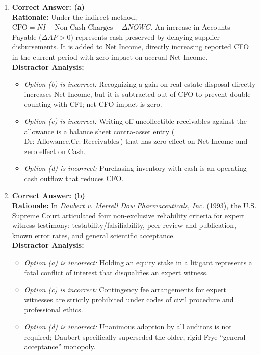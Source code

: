\begin{enumerate}[label=\textbf{MCQ 3.\arabic*}]
    \item \textbf{Correct Answer: (a)}\\
    \textbf{Rationale:} Under the indirect method, $\text{CFO} = NI + \text{Non-Cash Charges} - \Delta NOWC$. An increase in Accounts Payable ($\Delta AP > 0$) represents cash preserved by delaying supplier disbursements. It is added to Net Income, directly increasing reported CFO in the current period with zero impact on accrual Net Income.\\
    \textbf{Distractor Analysis:}
    \begin{itemize}
        \item \textit{Option (b) is incorrect:} Recognizing a gain on real estate disposal directly increases Net Income, but it is subtracted out of CFO to prevent double-counting with CFI; net CFO impact is zero.
        \item \textit{Option (c) is incorrect:} Writing off uncollectible receivables against the allowance is a balance sheet contra-asset entry ($\text{Dr: Allowance}, \text{Cr: Receivables}$) that has zero effect on Net Income and zero effect on Cash.
        \item \textit{Option (d) is incorrect:} Purchasing inventory with cash is an operating cash outflow that reduces CFO.
    \end{itemize}

    \item \textbf{Correct Answer: (b)}\\
    \textbf{Rationale:} In \textit{Daubert v. Merrell Dow Pharmaceuticals, Inc.} (1993), the U.S. Supreme Court articulated four non-exclusive reliability criteria for expert witness testimony: testability/falsifiability, peer review and publication, known error rates, and general scientific acceptance.\\
    \textbf{Distractor Analysis:}
    \begin{itemize}
        \item \textit{Option (a) is incorrect:} Holding an equity stake in a litigant represents a fatal conflict of interest that disqualifies an expert witness.
        \item \textit{Option (c) is incorrect:} Contingency fee arrangements for expert witnesses are strictly prohibited under codes of civil procedure and professional ethics.
        \item \textit{Option (d) is incorrect:} Unanimous adoption by all auditors is not required; Daubert specifically superseded the older, rigid Frye ``general acceptance'' monopoly.
    \end{itemize}
\end{enumerate}

